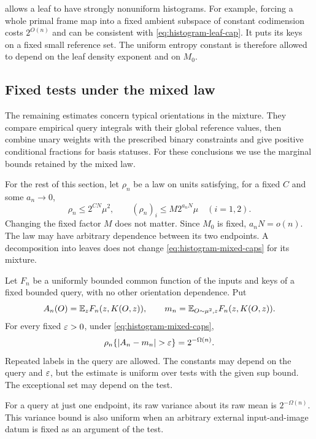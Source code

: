 \begin{remark}\label{rem:histogram-leaf-versus-mixed}
 allows a leaf to have strongly nonuniform
histograms. For example, forcing a whole primal frame map into a
fixed ambient subspace of constant codimension costs $2^{O(n)}$ and
can be consistent with \eqref{eq:histogram-leaf-cap}. It puts its keys
on a fixed small reference set. The uniform entropy constant is
therefore allowed to depend on the leaf density exponent and on $M_0$.
\end{remark}

\subsection{Fixed tests under the mixed law}

The remaining estimates concern typical orientations in the mixture.
They compare empirical query integrals with their global reference
values, then combine unary weights with the prescribed binary constraints
and give positive conditional fractions for basis statuses. For these
conclusions we use the marginal bounds retained by the mixed law.

For the rest of this section, let $\rho_n$ be a law on units satisfying,
for a fixed $C$ and some $a_n\to0$,
\begin{equation}\label{eq:histogram-mixed-caps}
 \rho_n\le2^{CN}\mu^2,
 \qquad (\rho_n)_i\le M2^{a_nN}\mu\quad(i=1,2).
\end{equation}
Changing the fixed factor $M$ does not matter. Since $M_0$ is fixed,
$a_nN=o(n)$. The law may have arbitrary dependence between its two
endpoints. A decomposition into leaves does not change
\eqref{eq:histogram-mixed-caps} for its mixture.

\begin{lemma}
\label{lem:typicality}
Let $F_n$ be a uniformly bounded common function of the inputs and
keys of a fixed bounded query, with no other orientation dependence.
Put
\[
 A_n(O)=\mathbb E_z F_n(z,K(O,z)),\qquad
 m_n=\mathbb E_{O\sim\mu^2,z}F_n(z,K(O,z)).
\]
For every fixed $\varepsilon>0$, under \eqref{eq:histogram-mixed-caps},
\[
 \rho_n\{\lvert A_n-m_n\rvert>\varepsilon\}=2^{-\Omega(n)}.
\]
Repeated labels in the query are allowed. The constants may depend on
the query and $\varepsilon$, but the estimate is uniform over tests with the
given sup bound. The exceptional set may depend on the test.

For a query at just one endpoint, its raw variance about its raw mean
is $2^{-\Omega(n)}$. This variance bound is also uniform when an
arbitrary external input-and-image datum is fixed as an argument of
the test.
\end{lemma}

